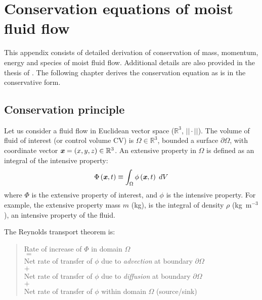 \chapter{Conservation equations of moist fluid flow}
\label{app:conservation}

This appendix consists of detailed derivation of conservation of mass, momentum, energy and species of moist fluid flow. Additional details are also provided in the thesis of \cite{Defraeye2011}. The following chapter derives the conservation equation as is in the conservative form. 

\section{Conservation principle}
\label{sec:Conservationprinciple}
Let us consider a fluid flow in Euclidean vector space ($\mathbb{R}^3$, $||\cdot||$). The volume of fluid of interest (or control volume CV) is $\Omega \in \mathbb{R}^3$, bounded a surface $\partial\Omega$, with coordinate vector $\textbf{\textit{x}} = (x,y,z) \in \mathbb{R}^3$. An extensive property in $\Omega$ is defined as an integral of the intensive property:
\begin{equation}
\Phi \left( \textbf{\textit{x}},t \right) \equiv \int_\Omega  \phi  \left( \textbf{\textit{x}},t \right)\;dV
\end{equation}
where $\Phi$ is the extensive property of interest, and $\phi$ is the intensive property. For example, the extensive property mass $m$ (kg), is the integral of density $\rho$ (kg~m$^{-3}$), an intensive property of the fluid. 

The Reynolds transport theorem is:
\begin{quote}
	\centering
	Rate of increase of $\Phi$ in domain $\Omega$\\
	$=$\\
	Net rate of transfer of $\phi$ due to \textit{advection} at boundary $\partial \Omega$\\
	$+$\\
	Net rate of transfer of $\phi$ due to \textit{diffusion} at boundary $\partial \Omega$\\
$+$\\	
	Net rate of transfer of $\phi$ within domain $\Omega$ (source/sink)
\end{quote}

